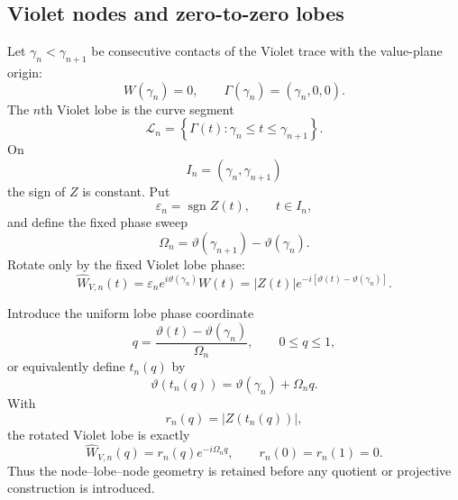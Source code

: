 \documentclass[11pt]{amsart}
\numberwithin{equation}{section}
\theoremstyle{plain}
\theoremstyle{definition}
\theoremstyle{remark}
\begin{document}
\subsection{Violet nodes and zero-to-zero lobes}
\label{subsec:nodes-lobes}

Let $\gamma_n<\gamma_{n+1}$ be consecutive contacts of the Violet trace with the value-plane origin:
\begin{equation}
\boxed{
W(\gamma_n)=0,
\qquad
\Gamma(\gamma_n)=(\gamma_n,0,0).
}
\label{eq:Violet-nodes}
\end{equation}
The $n$th Violet lobe is the curve segment
\begin{equation}
\boxed{
\mathcal L_n
=
\left\{\Gamma(t):\gamma_n\le t\le\gamma_{n+1}\right\}.
}
\label{eq:Violet-lobe}
\end{equation}
On
\begin{equation}
I_n=(\gamma_n,\gamma_{n+1})
\label{eq:lobe-interval}
\end{equation}
the sign of $Z$ is constant.  Put
\begin{equation}
\varepsilon_n=\operatorname{sgn}Z(t),
\qquad t\in I_n,
\label{eq:epsilon-n}
\end{equation}
and define the fixed phase sweep
\begin{equation}
\Omega_n=\vartheta(\gamma_{n+1})-\vartheta(\gamma_n).
\label{eq:Omega}
\end{equation}
Rotate only by the fixed Violet lobe phase:
\begin{equation}
\widehat W_{V,n}(t)
=\varepsilon_n e^{i\vartheta(\gamma_n)}W(t)
=|Z(t)|e^{-i[\vartheta(t)-\vartheta(\gamma_n)]}.
\label{eq:rotated-Violet-lobe}
\end{equation}

Introduce the uniform lobe phase coordinate
\begin{equation}
q=\frac{\vartheta(t)-\vartheta(\gamma_n)}{\Omega_n},
\qquad 0\le q\le1,
\label{eq:q-phase}
\end{equation}
or equivalently define $t_n(q)$ by
\begin{equation}
\boxed{
\vartheta(t_n(q))=\vartheta(\gamma_n)+\Omega_n q.
}
\label{eq:tq}
\end{equation}
With
\begin{equation}
r_n(q)=|Z(t_n(q))|,
\label{eq:rn}
\end{equation}
the rotated Violet lobe is exactly
\begin{equation}
\boxed{
\widehat W_{V,n}(q)=r_n(q)e^{-i\Omega_n q},
\qquad
r_n(0)=r_n(1)=0.
}
\label{eq:Violet-lobe-polar}
\end{equation}
Thus the node--lobe--node geometry is retained before any quotient or projective construction is introduced.
\end{document}
